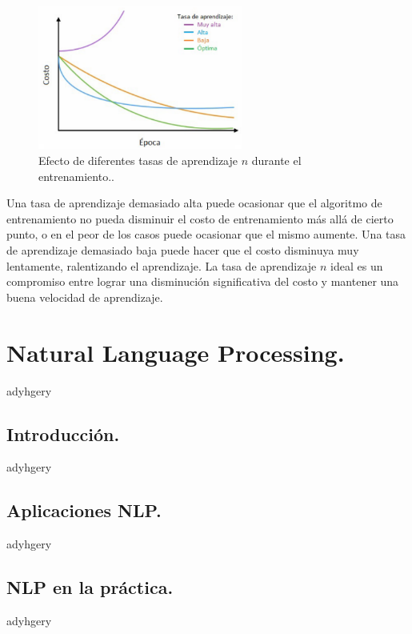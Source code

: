 \documentclass[12pt,a4paper]{article}
\begin{document}
\begin{sloppypar}
\begin{figure}[H]    %
 \centering
 \includegraphics[width=0.6\textwidth]{images/ANN/6-ANN.png}
  \captionsetup{justification=centering,margin=3cm}
 \caption{Efecto de diferentes tasas de aprendizaje $n$ durante el entrenamiento.\cite{ANN_25}.} 
 \label{fig:ann_6}
\end{figure}

Una tasa de aprendizaje demasiado alta puede ocasionar que el algoritmo de entrenamiento no pueda disminuir el costo de entrenamiento más allá de cierto punto, o en el peor de los casos puede ocasionar que el mismo aumente. Una tasa de aprendizaje demasiado baja puede hacer que el costo disminuya muy lentamente, ralentizando el aprendizaje. La tasa de aprendizaje $n$ ideal es un compromiso entre lograr una disminución significativa del costo y mantener una buena velocidad de aprendizaje\cite{ANN_25}.




\section{Natural Language Processing.}\label{4.NaturalLanguageProcessing}
adyhgery
\cleardoublepage

\subsection{Introducción.}\label{Intro_NLP}
adyhgery
\cleardoublepage

\subsection{Aplicaciones NLP.}\label{Aplicaciones_NLP}
adyhgery
\cleardoublepage

\subsection{NLP en la práctica.}\label{Practica_NLP}
adyhgery
\cleardoublepage


\end{sloppypar}
\end{document}
